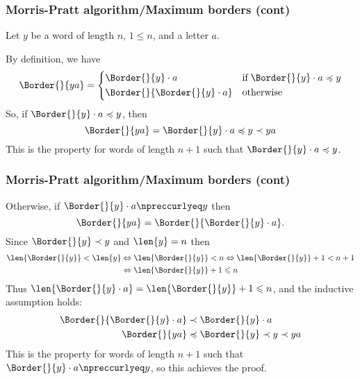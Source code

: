 %
\begin{frame}
\frametitle{Morris-Pratt algorithm/Maximum borders (cont)}

Let \(y\) be a word of length \(n\), \(1 \leqslant n\), and a letter
\(a\). 

\bigskip

By definition, we have 
\[
\Border{}{ya} = \left\{
\begin{aligned}
& \Border{}{y} \cdot a 
&& \text{if} \; \Border{}{y} \cdot a \preccurlyeq y\\
& \Border{}{\Border{}{y} \cdot a} 
&& \text{otherwise}
\end{aligned}
\right.
\]
So, if \(\Border{}{y} \cdot a \preccurlyeq y\), then 
\[
\Border{}{ya} = \Border{}{y} \cdot a \preccurlyeq y \prec ya 
\]
This is the property for words of length \(n+1\) such that
\(\Border{}{y} \cdot a \preccurlyeq y\).

\end{frame}

%
\begin{frame}
\frametitle{Morris-Pratt algorithm/Maximum borders (cont)}

Otherwise, if \(\Border{}{y} \cdot a \npreccurlyeq y\) then
\[
\Border{}{ya} = \Border{}{\Border{}{y} \cdot a}.
\]
Since \(\Border{}{y} \prec y\) and \(\len{y} = n\) then 
\begin{align*}
\len{\Border{}{y}} < \len{y}
&\Leftrightarrow
\len{\Border{}{y}} < n
\Leftrightarrow
\len{\Border{}{y}} + 1 < n + 1\\
&\Leftrightarrow
\len{\Border{}{y}} + 1 \leqslant n
\end{align*}
Thus \(\len{\Border{}{y} \cdot a} = \len{\Border{}{y}} + 1 \leqslant
n\), and the inductive assumption holds:
\begin{align*}
  \Border{}{\Border{}{y} \cdot a} 
& \prec \Border{}{y} \cdot a\\
  \Border{}{ya}
& \preccurlyeq \Border{}{y} \prec y \prec ya
\end{align*}
This is the property for words of length \(n+1\) such that
\(\Border{}{y} \cdot a \npreccurlyeq y\), so this achieves the proof.

\end{frame}

